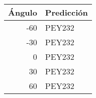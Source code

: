 \begin{tabular}{rl}
    \toprule
    Ángulo & Predicción \\
    \midrule
    -60    & PEY232     \\
    -30    & PEY232     \\
    0      & PEY232     \\
    30     & PEY232     \\
    60     & PEY232     \\
    \bottomrule
\end{tabular}
